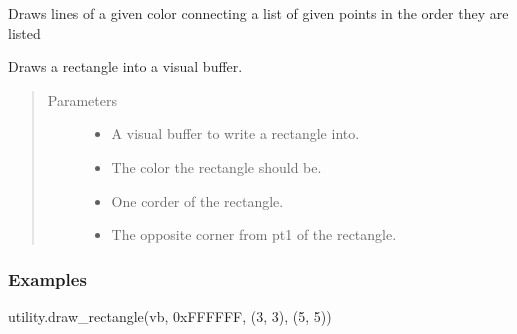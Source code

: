 \documentclass[letterpaper,10pt,english,openany,oneside]{sphinxmanual}
\begin{document}
\begin{fulllineitems}
\sphinxAtStartPar
Draws lines of a given color connecting a list of given points in the
order they are listed

\end{fulllineitems}



\begin{fulllineitems}
\sphinxAtStartPar
Draws a rectangle into a visual buffer.
\begin{quote}\begin{description}
\item[{Parameters}] \leavevmode\begin{itemize}
\item {} 
\sphinxAtStartPar
{} \textendash{} A visual buffer to write a rectangle into.

\item {} 
\sphinxAtStartPar
{} \textendash{} The color the rectangle should be.

\item {} 
\sphinxAtStartPar
{} \textendash{} One corder of the rectangle.

\item {} 
\sphinxAtStartPar
{} \textendash{} The opposite corner from pt1 of the rectangle.

\end{itemize}

\end{description}\end{quote}
\subsubsection*{Examples}

\sphinxAtStartPar
utility.draw\_rectangle(vb, 0xFFFFFF, (3, 3), (5, 5))

\end{fulllineitems}
\end{document}
